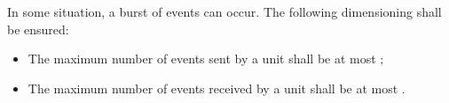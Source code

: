 In some situation, a burst of events can occur. The following
dimensioning shall be ensured:
\begin{itemize}
\item The maximum number of events sent by a unit shall be at most
  ;
\item The maximum number of events received by a unit shall be at most
  .
\end{itemize}



